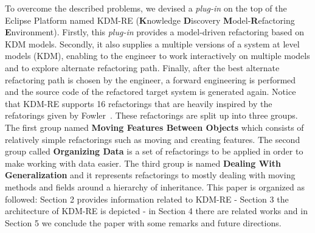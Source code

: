 To overcome the described problems, we devised a \textit{plug-in} on the top of the Eclipse Platform named KDM-RE (\textbf{K}nowledge \textbf{D}iscovery \textbf{M}odel-\textbf{R}efactoring \textbf{E}nvironment). Firstly, this \textit{plug-in} provides a model-driven refactoring based on KDM models. Secondly, it also supplies a multiple versions of a system at level models (KDM), enabling to the engineer  to work interactively on multiple models and to explore alternate refactoring path. Finally, after the best alternate refactoring path is chosen by the engineer, a forward engineering is performed and the source code of the refactored target system is generated again. Notice that KDM-RE supports 16 refactorings that are heavily inspired by the refatorings given by Fowler~\cite{aqui}. These refactorings are split up into three groups. The first group named \textbf{Moving Features Between Objects} which consists of relatively simple refactorings such as moving and creating features. The second group called \textbf{Organizing Data} is a set of refactorings to be applied in order to make working with data easier. The third group is named \textbf{Dealing With Generalization} and it represents refactorings to mostly dealing with moving methods and fields around a hierarchy of inheritance. This paper is organized as followed: Section 2 provides information related to KDM-RE - Section 3 the architecture of KDM-RE is depicted - in Section 4 there are related works and in Section 5 we conclude the paper with some remarks and future directions.





